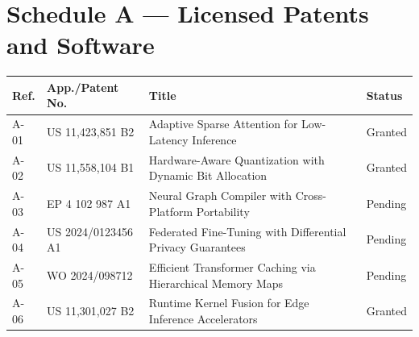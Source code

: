 \documentclass[11pt,a4paper]{article}
\begin{document}
\section*{\color{NexaNavy}Schedule A — Licensed Patents and Software}

\begin{tcolorbox}[
  enhanced,
  colback=NexaLight,
  colframe=NexaGold,
  boxrule=1.2pt,
  arc=3pt,
  title={\faFile\enspace Patent Portfolio — NeuronX Inference Engine},
  fonttitle=\bfseries\color{NexaNavy},
  coltitle=NexaNavy,
  attach boxed title to top left={yshift=-2mm, xshift=8mm},
  boxed title style={colback=NexaGold!20, colframe=NexaGold, arc=2pt},
  left=8pt, right=8pt, top=12pt, bottom=8pt
]
\vspace{4pt}
\noindent
\begin{tabularx}{\linewidth}{l l >{\RaggedRight}X l}
  \toprule
  \rowcolor{NexaNavy}
  \color{white}\textbf{Ref.} &
  \color{white}\textbf{App./Patent No.} &
  \color{white}\textbf{Title} &
  \color{white}\textbf{Status} \\
  \midrule
  A-01 & US 11,423,851 B2 & Adaptive Sparse Attention for Low-Latency Inference & Granted \\[2pt]
  \rowcolor{NexaIce}
  A-02 & US 11,558,104 B1 & Hardware-Aware Quantization with Dynamic Bit Allocation & Granted \\[2pt]
  A-03 & EP 4 102 987 A1 & Neural Graph Compiler with Cross-Platform Portability & Pending \\[2pt]
  \rowcolor{NexaIce}
  A-04 & US 2024/0123456 A1 & Federated Fine-Tuning with Differential Privacy Guarantees & Pending \\[2pt]
  A-05 & WO 2024/098712 & Efficient Transformer Caching via Hierarchical Memory Maps & Pending \\[2pt]
  \rowcolor{NexaIce}
  A-06 & US 11,301,027 B2 & Runtime Kernel Fusion for Edge Inference Accelerators & Granted \\
  \bottomrule
\end{tabularx}
\end{tcolorbox}

\vspace{12pt}
\end{document}
